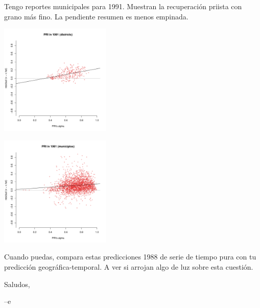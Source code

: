 \documentclass[11pt]{article}
\begin{document}
Tengo reportes municipales para 1991. Muestran la recuperación priista con grano más fino. La pendiente resumen es menos empinada. 

\begin{center}
\includegraphics[width=200px]{./PRI1991alphaPRI.pdf}
\end{center}
\begin{center}
\includegraphics[width=200px]{./PRI1991alphaPRI.mun.pdf}
\end{center}

Cuando puedas, compara estas predicciones 1988 de serie de tiempo pura con tu predicción geográfica-temporal. A ver si arrojan algo de luz sobre esta cuestión.

Saludos, 

--e
\end{document}
